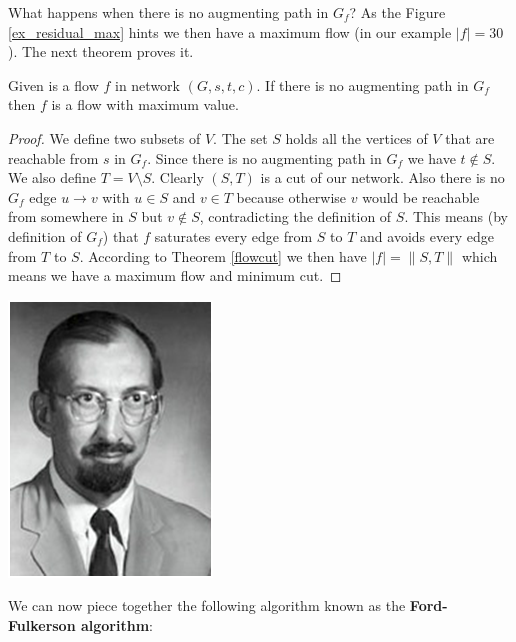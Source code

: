What happens when there is no augmenting path in $G_f$? As the Figure \ref{ex_residual_max} hints we then have a maximum flow (in our example $|f| = 30$). The next theorem proves it.

\begin{thm}\label{no_augmenting}
Given is a flow $f$ in network $(G, s, t, c)$. If there is no augmenting path in $G_f$ then $f$ is a flow with maximum value.
\end{thm}

\begin{proof}
We define two subsets of $V$. The set $S$ holds all the vertices of $V$ that are reachable from $s$ in $G_f$. Since there is no augmenting path in $G_f$ we have $t \notin S$. We also define $T = V \setminus S$. Clearly $(S, T)$ is a cut of our network. Also there is no $G_f$ edge $u \rightarrow v$ with $u \in S$ and $v \in T$ because otherwise $v$ would be reachable from somewhere in $S$ but $v \notin S$, contradicting the definition of $S$. This means (by definition of $G_f$) that $f$ saturates every edge from $S$ to $T$ and avoids every edge from $T$ to $S$. According to Theorem \ref{flowcut} we then have $|f| = \|S, T\|$ which means we have a maximum flow and minimum cut.

\end{proof}

\begin{marginfigure}[0.0in]
\includegraphics[scale=0.8]{fulkerson.png}
\end{marginfigure}

We can now piece together the following algorithm known as the \textbf{Ford-Fulkerson algorithm}:

